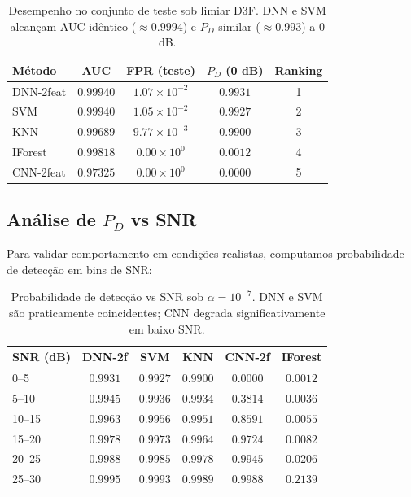 \documentclass[10pt, a4paper]{article}
\begin{document}
\begin{table}[H]
\centering
\begin{tabular}{lcccc}
\toprule
\textbf{Método} & \textbf{AUC} & \textbf{FPR (teste)} & \textbf{$P_D$ (0 dB)} & \textbf{Ranking} \\
\midrule
DNN-2feat & $0.99940$ & $1.07 \times 10^{-2}$ & $0.9931$ & 1 \\
SVM & $0.99940$ & $1.05 \times 10^{-2}$ & $0.9927$ & 2 \\
KNN & $0.99689$ & $9.77 \times 10^{-3}$ & $0.9900$ & 3 \\
IForest & $0.99818$ & $0.00 \times 10^{0}$ & $0.0012$ & 4 \\
CNN-2feat & $0.97325$ & $0.00 \times 10^{0}$ & $0.0000$ & 5 \\
\bottomrule
\end{tabular}
\caption{Desempenho no conjunto de teste sob limiar D3F. DNN e SVM alcançam AUC idêntico ($\approx 0.9994$) e $P_D$ similar ($\approx 0.993$) a 0 dB.}
\end{table}

\subsection{Análise de $P_D$ vs SNR}

Para validar comportamento em condições realistas, computamos probabilidade de detecção em bins de SNR:

\begin{table}[H]
\centering
\begin{tabular}{lccccc}
\toprule
\textbf{SNR (dB)} & \textbf{DNN-2f} & \textbf{SVM} & \textbf{KNN} & \textbf{CNN-2f} & \textbf{IForest} \\
\midrule
0--5 & $0.9931$ & $0.9927$ & $0.9900$ & $0.0000$ & $0.0012$ \\
5--10 & $0.9945$ & $0.9936$ & $0.9934$ & $0.3814$ & $0.0036$ \\
10--15 & $0.9963$ & $0.9956$ & $0.9951$ & $0.8591$ & $0.0055$ \\
15--20 & $0.9978$ & $0.9973$ & $0.9964$ & $0.9724$ & $0.0082$ \\
20--25 & $0.9988$ & $0.9985$ & $0.9978$ & $0.9945$ & $0.0206$ \\
25--30 & $0.9995$ & $0.9993$ & $0.9989$ & $0.9988$ & $0.2139$ \\
\bottomrule
\end{tabular}
\caption{Probabilidade de detecção vs SNR sob $\alpha=10^{-7}$. DNN e SVM são praticamente coincidentes; CNN degrada significativamente em baixo SNR.}
\end{table}
\end{document}
